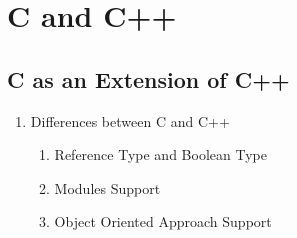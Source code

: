 \chapter{C and C++}
\label{chapter:CAndCpp}

\section{C as an Extension of C++}




%
%



    \begin{enumerate}
      \item Differences between C and C++
	\begin{enumerate}
	 \item Reference Type and Boolean Type
	 \item Modules Support
	 \item Object Oriented Approach Support
	\end{enumerate}
    \end{enumerate}
  